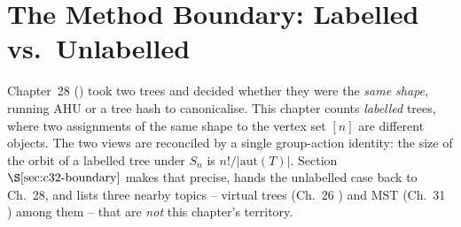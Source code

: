 \section{The Method Boundary: Labelled vs.\ Unlabelled}\label{sec:c32-boundary}

\begin{previouslybox}
Chapter~28 () took two trees and decided whether they were the
\emph{same shape}, running AHU or a tree hash to canonicalise.  This chapter
counts \emph{labelled} trees, where two assignments of the same shape to the
vertex set \([n]\) are different objects.  The two views are reconciled by a
single group-action identity: the size of the orbit of a labelled tree under
\(S_n\) is \(n!/|\mathrm{aut}(T)|\).  Section \(\secref{c32-boundary}\) makes that
precise, hands the unlabelled case back to Ch.~28, and lists three nearby
topics -- virtual trees (Ch.~26 ) and MST (Ch.~31 )
among them -- that are \emph{not} this chapter's territory.
\end{previouslybox}

